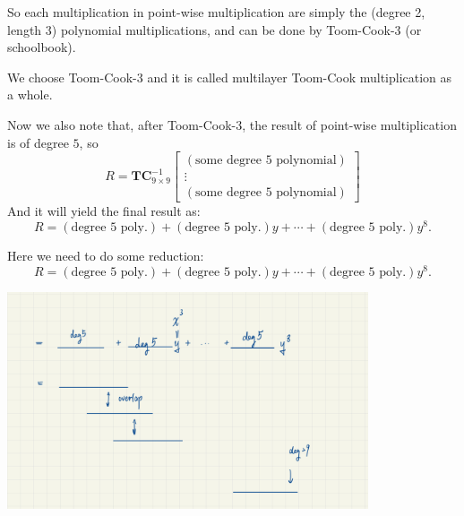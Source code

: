 \documentclass[
11pt,notheorems,hyperref={pdfauthor=whatever}
]{beamer}
\begin{document}
\begin{frame}
    So each multiplication in point-wise multiplication are simply the (degree 2, length 3) polynomial multiplications, and can be done by Toom-Cook-3 (or schoolbook).

    We choose Toom-Cook-3 and it is called multilayer Toom-Cook multiplication as a whole.


    Now we also note that, after Toom-Cook-3, the result of point-wise multiplication is of degree $5$, so 
    \[
    R = \mathbf{TC}_{9\times 9}^{-1}\begin{bmatrix}
        (\text{some degree 5 polynomial})\\
        \vdots\\
        (\text{some degree 5 polynomial})
    \end{bmatrix}
    \]
    And it will yield the final result as:
    \[
    R = (\text{degree 5 poly.}) + (\text{degree 5 poly.})y+\cdots+(\text{degree 5 poly.})y^8.
    \]

\end{frame}

\begin{frame}
    Here we need to do some reduction:
    \[
    R = (\text{degree 5 poly.}) + (\text{degree 5 poly.})y+\cdots+(\text{degree 5 poly.})y^8.
    \]
    \begin{center}
        \includegraphics[width = 0.8\textwidth]{Figures/Multilayer1.jpeg}
    \end{center}
\end{frame}



\end{document}

